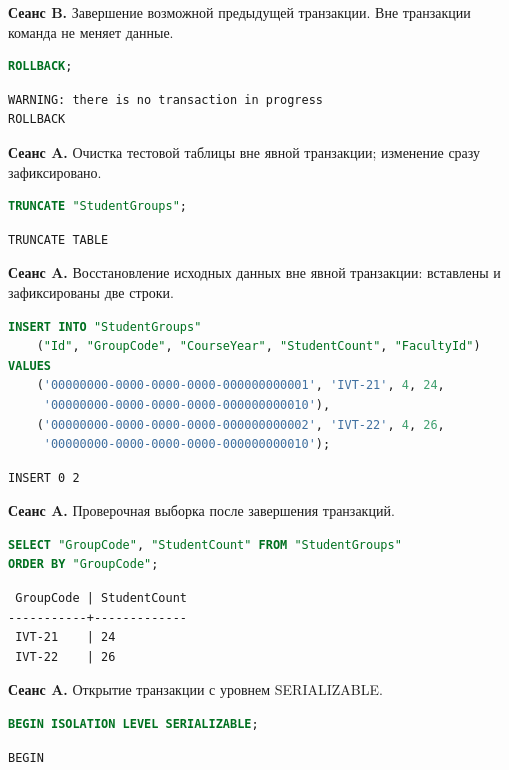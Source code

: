 \documentclass[12pt,a4paper]{article}
\begin{document}
\textbf{Сеанс B.} Завершение возможной предыдущей транзакции. Вне транзакции команда не меняет данные.
\begin{lstlisting}[language=SQL]
ROLLBACK;
\end{lstlisting}

\begin{lstlisting}
WARNING: there is no transaction in progress
ROLLBACK
\end{lstlisting}

\textbf{Сеанс A.} Очистка тестовой таблицы вне явной транзакции; изменение сразу зафиксировано.
\begin{lstlisting}[language=SQL]
TRUNCATE "StudentGroups";
\end{lstlisting}

\begin{lstlisting}
TRUNCATE TABLE
\end{lstlisting}

\textbf{Сеанс A.} Восстановление исходных данных вне явной транзакции: вставлены и зафиксированы две строки.
\begin{lstlisting}[language=SQL]
INSERT INTO "StudentGroups"
    ("Id", "GroupCode", "CourseYear", "StudentCount", "FacultyId")
VALUES
    ('00000000-0000-0000-0000-000000000001', 'IVT-21', 4, 24,
     '00000000-0000-0000-0000-000000000010'),
    ('00000000-0000-0000-0000-000000000002', 'IVT-22', 4, 26,
     '00000000-0000-0000-0000-000000000010');
\end{lstlisting}

\begin{lstlisting}
INSERT 0 2
\end{lstlisting}

\textbf{Сеанс A.} Проверочная выборка после завершения транзакций.
\begin{lstlisting}[language=SQL]
SELECT "GroupCode", "StudentCount" FROM "StudentGroups"
ORDER BY "GroupCode";
\end{lstlisting}

\begin{lstlisting}
 GroupCode | StudentCount
-----------+-------------
 IVT-21    | 24
 IVT-22    | 26
\end{lstlisting}

\textbf{Сеанс A.} Открытие транзакции с уровнем SERIALIZABLE.
\begin{lstlisting}[language=SQL]
BEGIN ISOLATION LEVEL SERIALIZABLE;
\end{lstlisting}

\begin{lstlisting}
BEGIN
\end{lstlisting}
\end{document}
